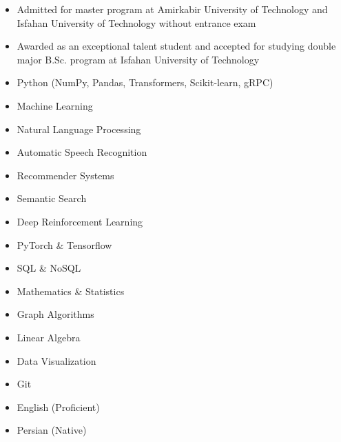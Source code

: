 \documentclass[10pt,a4paper,ragged2e,withhyper]{altacv}
\begin{document}
\vspace*{-1\multicolsep}
\begin{multicols}{2}
	\begin{itemize}
		\item Admitted for master program at Amirkabir University of Technology and Isfahan University of Technology without entrance exam
		\item Awarded as an exceptional talent student and accepted for studying double major B.Sc. program at Isfahan University of Technology
	\end{itemize}
\end{multicols}
\vspace*{-1\multicolsep}



\vspace*{-.5\multicolsep}
\begin{multicols}{3}
	\begin{itemize}
		\item Python (NumPy, Pandas, Transformers, Scikit-learn, gRPC)
		\item Machine Learning
		\item Natural Language Processing
        \item Automatic Speech Recognition
        \item Recommender Systems
        \item Semantic Search
		\item Deep Reinforcement Learning 
		\item PyTorch \& Tensorflow
		\item SQL \& NoSQL
		\item Mathematics \& Statistics
		\item Graph Algorithms
		\item Linear Algebra
		\item Data Visualization
		\item Git
	\end{itemize}
\end{multicols}
\vspace*{-.5\multicolsep}


\vspace*{-1\multicolsep}
\begin{multicols}{2}
\begin{itemize}
	\item English (Proficient)
	\item Persian (Native)
\end{itemize}
\end{multicols}
\vspace*{-1\multicolsep}
\end{document}
